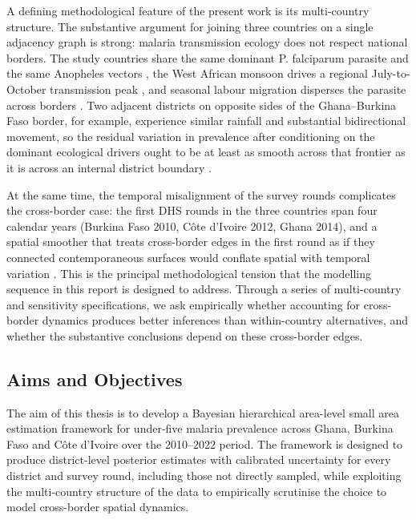 \documentclass{article}
\begin{document}
A defining methodological feature of the present work is its
multi-country structure. The substantive argument for joining three
countries on a single adjacency graph is strong: malaria transmission
ecology does not respect national borders. The study countries share the
same dominant P. falciparum parasite and the same Anopheles vectors
\citep{who2023}, the West African monsoon drives a regional
July-to-October transmission peak \citep{bhatt2015}, and seasonal labour
migration disperses the parasite across borders \citep{gething2011}. Two
adjacent districts on opposite sides of the Ghana--Burkina Faso border,
for example, experience similar rainfall and substantial bidirectional
movement, so the residual variation in prevalence after conditioning on
the dominant ecological drivers ought to be at least as smooth across
that frontier as it is across an internal district boundary
\citep{weiss2020}.

At the same time, the temporal misalignment of the survey rounds
complicates the cross-border case: the first DHS rounds in the three
countries span four calendar years (Burkina Faso 2010, Côte d'Ivoire
2012, Ghana 2014), and a spatial smoother that treats cross-border edges
in the first round as if they connected contemporaneous surfaces would
conflate spatial with temporal variation \citep{saldarriaga2020}. This
is the principal methodological tension that the modelling sequence in
this report is designed to address. Through a series of multi-country
and sensitivity specifications, we ask empirically whether accounting
for cross-border dynamics produces better inferences than within-country
alternatives, and whether the substantive conclusions depend on these
cross-border edges.

\subsection{Aims and Objectives}\label{aims-and-objectives}

The aim of this thesis is to develop a Bayesian hierarchical area-level
small area estimation framework for under-five malaria prevalence across
Ghana, Burkina Faso and Côte d'Ivoire over the 2010--2022 period. The
framework is designed to produce district-level posterior estimates with
calibrated uncertainty for every district and survey round, including
those not directly sampled, while exploiting the multi-country structure
of the data to empirically scrutinise the choice to model cross-border
spatial dynamics.
\end{document}
